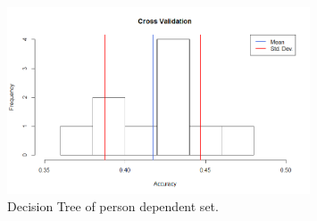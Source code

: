 \documentclass[paper=a4, fontsize=11pt]{scrartcl} %
\begin{document}
\begin{figure}[h]
	\centering
	\includegraphics[width=0.8\textwidth]{figures/crossValidation.png}
	\caption{Decision Tree of person dependent set.}
	\label{fig:scree}
\end{figure}
\end{document}
